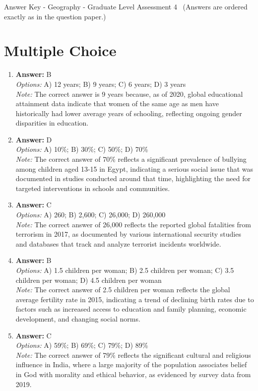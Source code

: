 \documentclass[12pt]{article}
\begin{document}
\begin{center}
Answer Key - Geography - Graduate Level Assessment 4 \
\small (Answers are ordered exactly as in the question paper.)
\end{center}

\section*{Multiple Choice}
\begin{enumerate}[label=\arabic*.]
\item \textbf{Answer:} B
\\ \textit{Options:} A) 12 years; B) 9 years; C) 6 years; D) 3 years
\\ \textit{Note:} The correct answer is 9 years because, as of 2020, global educational attainment data indicate that women of the same age as men have historically had lower average years of schooling, reflecting ongoing gender disparities in education.
\item \textbf{Answer:} D
\\ \textit{Options:} A) 10\%; B) 30\%; C) 50\%; D) 70\%
\\ \textit{Note:} The correct answer of 70\% reflects a significant prevalence of bullying among children aged 13-15 in Egypt, indicating a serious social issue that was documented in studies conducted around that time, highlighting the need for targeted interventions in schools and communities.
\item \textbf{Answer:} C
\\ \textit{Options:} A) 260; B) 2,600; C) 26,000; D) 260,000
\\ \textit{Note:} The correct answer of 26,000 reflects the reported global fatalities from terrorism in 2017, as documented by various international security studies and databases that track and analyze terrorist incidents worldwide.
\item \textbf{Answer:} B
\\ \textit{Options:} A) 1.5 children per woman; B) 2.5 children per woman; C) 3.5 children per woman; D) 4.5 children per woman
\\ \textit{Note:} The correct answer of 2.5 children per woman reflects the global average fertility rate in 2015, indicating a trend of declining birth rates due to factors such as increased access to education and family planning, economic development, and changing social norms.
\item \textbf{Answer:} C
\\ \textit{Options:} A) 59\%; B) 69\%; C) 79\%; D) 89\%
\\ \textit{Note:} The correct answer of 79\% reflects the significant cultural and religious influence in India, where a large majority of the population associates belief in God with morality and ethical behavior, as evidenced by survey data from 2019.
\end{enumerate}
\end{document}
